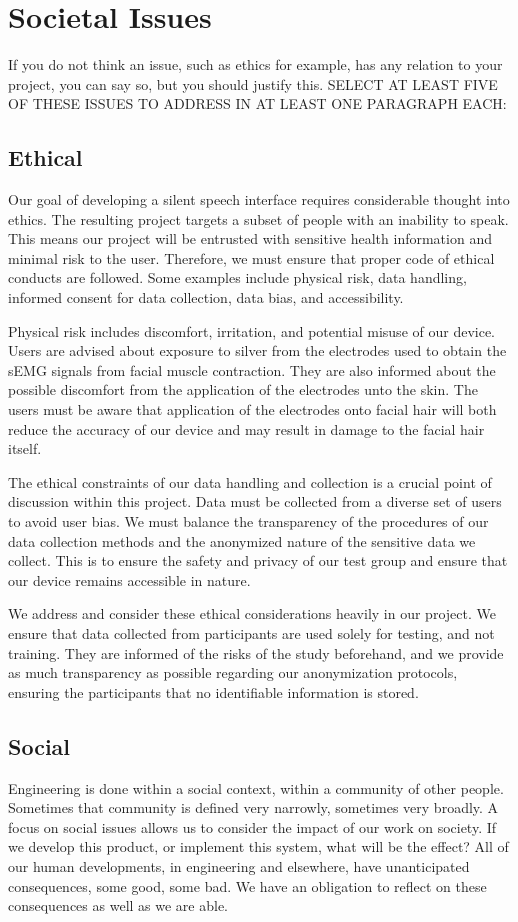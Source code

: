 \chapter{Societal Issues}
If you do not think an issue, such as ethics for example, has any relation to your project, you can say so, but you should justify this. SELECT AT LEAST FIVE OF THESE ISSUES TO ADDRESS IN AT LEAST ONE PARAGRAPH EACH:

\section{Ethical}
Our goal of developing a silent speech interface requires considerable thought into ethics.
The resulting project targets a subset of people with an inability to speak. This means our project
 will be entrusted with sensitive health information and minimal risk to the user. Therefore, we must
ensure that proper code of ethical conducts are followed. Some examples include physical risk, data 
handling, informed consent for data collection, data bias, and accessibility.

Physical risk includes discomfort, irritation, and potential misuse of our device. Users are advised about
 exposure to silver from the electrodes used to obtain the sEMG signals from facial muscle contraction. They are also
 informed about the possible discomfort from the application of the electrodes unto the skin. The users must be aware
 that application of the electrodes onto facial hair will both reduce the accuracy of our device and may result in 
 damage to the facial hair itself.

The ethical constraints of our data handling and collection is a crucial point of discussion within this project.
 Data must be collected from a diverse set of users to avoid user bias. We must balance the transparency of the procedures 
 of our data collection methods and the anonymized nature of the sensitive data we collect. This is to ensure the safety and privacy
 of our test group and ensure that our device remains accessible in nature.

We address and consider these ethical considerations heavily in our project. We ensure that data collected from participants are used
 solely for testing, and not training. They are informed of the risks of the study beforehand, and we provide as much transparency as
 possible regarding our anonymization protocols, ensuring the participants that no identifiable information is stored.

\section{Social}
Engineering is done within a social context, within a community of other people. Sometimes that community is defined very narrowly, sometimes very broadly. A focus on social issues allows us to consider the impact of our work on society. If we develop this product, or implement this system, what will be the effect? All of our human developments, in engineering and elsewhere, have unanticipated consequences, some good, some bad. We have an obligation to reflect on these consequences as well as we are able.


